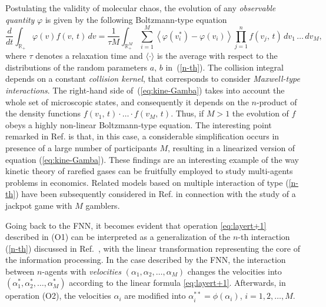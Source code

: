 \documentclass{article}
\newcommand{\fer}[1]{(\ref{#1})}
\newcommand{\R}{\mathbb R}
\def\R{\mathbb{R}}
\begin{document}
% 
Postulating the validity of molecular chaos, the evolution of any \textit{observable quantity} $\varphi$
is given by the following Boltzmann-type equation
\begin{equation}
    \frac{d}{dt}\int_{\R_+}\varphi(v)f(v,\,t)\,dv=
        \frac{1}{\tau M} \int_{\R_+^M}\sum_{i=1}^{M}\left\langle{\varphi(v_i^\ast)-\varphi(v_i)}\right\rangle{\prod_{j=1}^{n}f(v_j,\,t)}\,dv_1\,\dots\,dv_M,
    \label{eq:kine-Gamba}
\end{equation}
where $\tau$ denotes a relaxation time and $\langle{\cdot}\rangle$ is the average with respect to the distributions of the random parameters $a,\,b$ in~\fer{n-th}. 
% 
The collision integral depends on a constant \textit{collision kernel},  that corresponds to consider \textit{Maxwell-type interactions}. 
% 
The right-hand side of~\fer{eq:kine-Gamba} takes into account the whole set of microscopic states, and consequently it depends on the $n$-product of the density functions $f(v_1,\,t)\cdot\ldots\cdot f(v_M,\,t)$. 
% 
Thus, if $M>1$ the evolution of $f$ obeys a highly non-linear Boltzmann-type equation. 
% 
The interesting point remarked in Ref. \cite{BCG} is that, in this case, a considerable simplification occurs in presence of a large number of participants $M$, resulting in a linearized version of equation \fer{eq:kine-Gamba}.
% 
These findings are an interesting example of the way kinetic theory of rarefied gases can be fruitfully employed to study multi-agents problems in economics.
% 
Related models based on multiple interaction of type \fer{n-th} have been subsequently considered in Ref. \cite{TTZ} in connection with the study of a jackpot game with $M$ gamblers. 
% 

Going back to the FNN, it becomes evident that operation \eqref{eq:layert+1} described in (O1) can be interpreted as a generalization of the $n$-th interaction \fer{n-th} discussed in Ref.~\cite{BCG}, with the linear transformation representing the core of the information processing.
% 
In the case described by the FNN, the interaction between $n$-agents with \emph{velocities} $(\alpha_1,\alpha_2,\dots,\alpha_{M})$ changes the velocities into $(\alpha_1^*,\alpha_2^*,\dots,\alpha_{M}^*)$ according to the linear formula \eqref{eq:layert+1}. 
% 
Afterwards, in operation (O2), the velocities $\alpha_i$ are modified into $\alpha^{**}_i = \phi(\alpha_i)$, $i =1,2,\dots, M$.
% 
\end{document}
